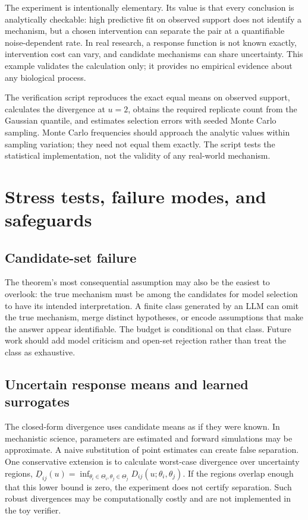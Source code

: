 \documentclass[11pt]{article}
\begin{document}
The experiment is intentionally elementary. Its value is that every conclusion is analytically checkable: high predictive fit on observed support does not identify a mechanism, but a chosen intervention can separate the pair at a quantifiable noise-dependent rate. In real research, a response function is not known exactly, intervention cost can vary, and candidate mechanisms can share uncertainty. This example validates the calculation only; it provides no empirical evidence about any biological process.

The verification script reproduces the exact equal means on observed support, calculates the divergence at $u=2$, obtains the required replicate count from the Gaussian quantile, and estimates selection errors with seeded Monte Carlo sampling. Monte Carlo frequencies should approach the analytic values within sampling variation; they need not equal them exactly. The script tests the statistical implementation, not the validity of any real-world mechanism.

\section{Stress tests, failure modes, and safeguards}
\subsection{Candidate-set failure}
The theorem's most consequential assumption may also be the easiest to overlook: the true mechanism must be among the candidates for model selection to have its intended interpretation. A finite class generated by an LLM can omit the true mechanism, merge distinct hypotheses, or encode assumptions that make the answer appear identifiable. The budget is conditional on that class. Future work should add model criticism and open-set rejection rather than treat the class as exhaustive.

\subsection{Uncertain response means and learned surrogates}
The closed-form divergence uses candidate means as if they were known. In mechanistic science, parameters are estimated and forward simulations may be approximate. A naive substitution of point estimates can create false separation. One conservative extension is to calculate worst-case divergence over uncertainty regions, $\underline D_{ij}(u)=\inf_{\theta_i\in\Theta_i,\theta_j\in\Theta_j}D_{ij}(u;\theta_i,\theta_j)$. If the regions overlap enough that this lower bound is zero, the experiment does not certify separation. Such robust divergences may be computationally costly and are not implemented in the toy verifier.
\end{document}
